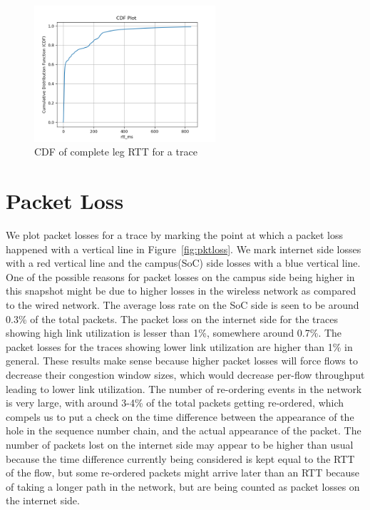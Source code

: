 \begin{figure}[t]
    \centering
        \includegraphics[width=0.6\textwidth]{Figures/complete_rtt.png}
    \caption[CDF of complete leg RTT for a trace]{CDF of complete leg RTT for a trace}
    \label{fig:rttcomplete}
    \bigskip
\end{figure}

\section{Packet Loss}

We plot packet losses for a trace by marking the point at which a packet loss happened with a vertical line in Figure~\ref{fig:pktloss}. We mark internet side losses with a red vertical line and the campus(SoC) side losses with a blue vertical line.  One of the possible reasons for packet losses on the campus side being higher in this snapshot might be due to higher losses in the wireless network as compared to the wired network. The average loss rate on the SoC side is seen to be around 0.3\% of the total packets. The packet loss on the internet side for the traces showing high link utilization is lesser than 1\%, somewhere around 0.7\%. The packet losses for the traces showing lower link utilization are higher than 1\% in general. These results make sense because higher packet losses will force flows to decrease their congestion window sizes, which would decrease per-flow throughput leading to lower link utilization. The number of re-ordering events in the network is very large, with around 3-4\% of the total packets getting re-ordered, which compels us to put a check on the time difference between the appearance of the hole in the sequence number chain, and the actual appearance of the packet. The number of packets lost on the internet side may appear to be higher than usual because the time difference currently being considered is kept equal to the RTT of the flow, but some re-ordered packets might arrive later than an RTT because of taking a longer path in the network, but are being counted as packet losses on the internet side. 

